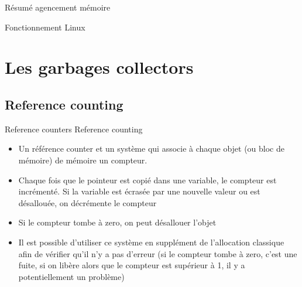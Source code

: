 \begin{frame}[fragile=singleslide]{Résumé agencement mémoire}
\end{frame}

\begin{frame}[fragile=singleslide]{Fonctionnement Linux}
\end{frame}

\section{Les garbages collectors}

\subsection{Reference counting}

\begin{frame}[fragile=singleslide]{Reference counters}
 Reference counting
    \begin{itemize}
    \item  Un référence  counter et  un système  qui associe  à chaque
      objet (ou bloc de mémoire) de mémoire un compteur.
    \item Chaque fois que le  pointeur est copié dans une variable, le
      compteur  est incrémenté.  Si la  variable est  écrasée  par une
      nouvelle valeur ou est désallouée, on décrémente le compteur
    \item Si le compteur tombe à zero, on peut désallouer l'objet
    \item  Il est  possible  d'utiliser ce  système  en supplément  de
      l'allocation classique afin de vérifier qu'il n'y a pas d'erreur
      (si  le compteur tombe  à zero,  c'est une  fuite, si  on libère
      alors que le compteur est  supérieur à 1, il y a potentiellement
      un problème)
    \end{itemize}
  \end{frame}

